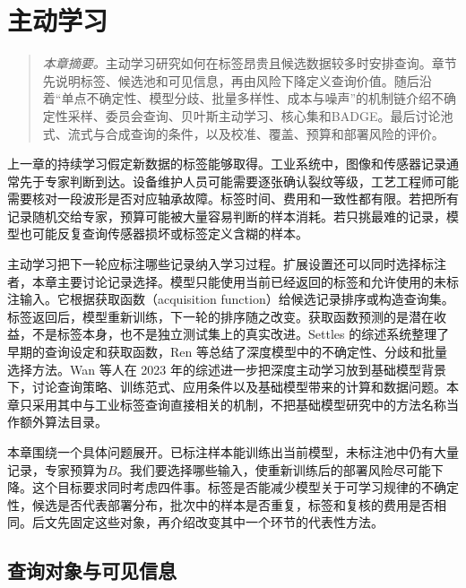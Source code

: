 \chapter{主动学习}
\label{chap:active}
\begin{quote}\small
\textit{本章摘要。}主动学习研究如何在标签昂贵且候选数据较多时安排查询。章节先说明标签、候选池和可见信息，再由风险下降定义查询价值。随后沿着“单点不确定性、模型分歧、批量多样性、成本与噪声”的机制链介绍不确定性采样、委员会查询、贝叶斯主动学习、核心集和BADGE。最后讨论池式、流式与合成查询的条件，以及校准、覆盖、预算和部署风险的评价。
\end{quote}

上一章的持续学习假定新数据的标签能够取得。工业系统中，图像和传感器记录通常先于专家判断到达。设备维护人员可能需要逐张确认裂纹等级，工艺工程师可能需要核对一段波形是否对应轴承故障。标签时间、费用和一致性都有限。若把所有记录随机交给专家，预算可能被大量容易判断的样本消耗。若只挑最难的记录，模型也可能反复查询传感器损坏或标签定义含糊的样本。

主动学习把下一轮应标注哪些记录纳入学习过程。扩展设置还可以同时选择标注者，本章主要讨论记录选择。模型只能使用当前已经返回的标签和允许使用的未标注输入。它根据获取函数（acquisition function）给候选记录排序或构造查询集。标签返回后，模型重新训练，下一轮的排序随之改变。获取函数预测的是潜在收益，不是标签本身，也不是独立测试集上的真实改进。Settles 的综述系统整理了早期的查询设定和获取函数，Ren 等总结了深度模型中的不确定性、分歧和批量选择方法。Wan 等人在 2023 年的综述进一步把深度主动学习放到基础模型背景下，讨论查询策略、训练范式、应用条件以及基础模型带来的计算和数据问题\cite{settles2009active,ren2020deepactive,wan2023foundationactive}。本章只采用其中与工业标签查询直接相关的机制，不把基础模型研究中的方法名称当作额外算法目录。

本章围绕一个具体问题展开。已标注样本能训练出当前模型，未标注池中仍有大量记录，专家预算为$B$。我们要选择哪些输入，使重新训练后的部署风险尽可能下降。这个目标要求同时考虑四件事。标签是否能减少模型关于可学习规律的不确定性，候选是否代表部署分布，批次中的样本是否重复，标签和复核的费用是否相同。后文先固定这些对象，再介绍改变其中一个环节的代表性方法。

\section{查询对象与可见信息}

